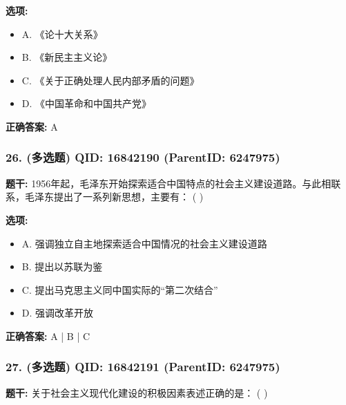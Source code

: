 \documentclass[12pt,UTF8]{ctexart}
\begin{document}
\textbf{选项:}
\begin{itemize}[leftmargin=*]

  \item A. 《论十大关系》

  \item B. 《新民主主义论》

  \item C. 《关于正确处理人民内部矛盾的问题》

  \item D. 《中国革命和中国共产党》

\end{itemize}

\textbf{正确答案:}
A

\vspace{0.3em}\hrulefill\vspace{0.7em}

\subsubsection*{26. (多选题) \small QID: 16842190 (ParentID: 6247975)}

\textbf{题干:}
1956年起，毛泽东开始探索适合中国特点的社会主义建设道路。与此相联系，毛泽东提出了一系列新思想，主要有： ( )



\textbf{选项:}
\begin{itemize}[leftmargin=*]

  \item A. 强调独立自主地探索适合中国情况的社会主义建设道路

  \item B. 提出以苏联为鉴

  \item C. 提出马克思主义同中国实际的“第二次结合”

  \item D. 强调改革开放

\end{itemize}

\textbf{正确答案:}
A | B | C

\vspace{0.3em}\hrulefill\vspace{0.7em}

\subsubsection*{27. (多选题) \small QID: 16842191 (ParentID: 6247975)}

\textbf{题干:}
关于社会主义现代化建设的积极因素表述正确的是： ( )
\end{document}
